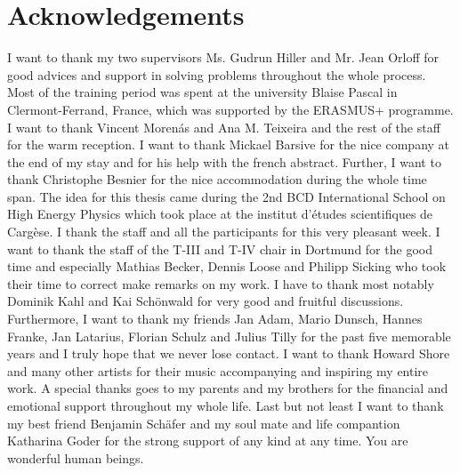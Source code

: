 \newpage
\section*{Acknowledgements}
I want to thank my two supervisors Ms. Gudrun Hiller and Mr. Jean Orloff for good advices and support in solving problems throughout the whole
process. Most of
the training period was spent at the university Blaise Pascal in Clermont-Ferrand, France, which was supported by the ERASMUS+ programme. I want
to thank Vincent Morenás and Ana M. Teixeira and the rest of the staff for the warm reception. I want to thank Mickael Barsive for the nice company 
at the end of my stay and for his
help with the french abstract. Further, I want to thank Christophe Besnier for the nice accommodation during the whole time span. The idea for this 
thesis came during the 2nd BCD International School on High Energy Physics which took place at the institut d'études scientifiques de Cargèse. I thank
the staff and all the participants for this very pleasant week. I want to thank the staff of the T-III and T-IV chair in Dortmund for the good time 
and especially Mathias Becker,
Dennis Loose and Philipp Sicking who took their time to correct make remarks on my work. I have to thank most notably Dominik Kahl and Kai Schönwald 
for very good and fruitful 
discussions. Furthermore, I want to thank my friends Jan Adam, Mario Dunsch, Hannes Franke, Jan Latarius, Florian Schulz and Julius Tilly for the past 
five memorable years and I truly hope that we never lose contact. I want to thank Howard Shore and many other artists for their music accompanying
and inspiring
my entire work. A special thanks goes to my parents and my brothers for the financial and emotional support throughout my whole life. Last but not least
I want to thank my best friend Benjamin Schäfer and my soul mate and life compantion Katharina Goder for the strong support of any kind at any time. 
You are wonderful human beings.



